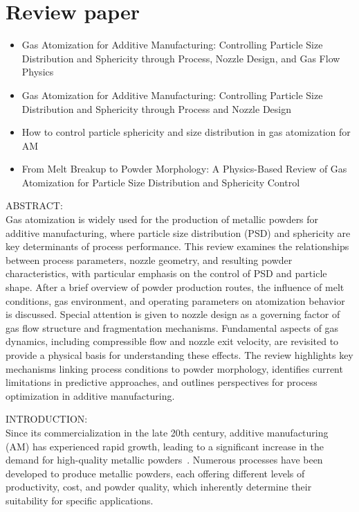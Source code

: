 \documentclass[../main]{subfiles}
\begin{document}
\section{Review paper}

\begin{itemize}
    \item Gas Atomization for Additive Manufacturing: Controlling Particle Size Distribution and Sphericity through Process, Nozzle Design, and Gas Flow Physics
    \item Gas Atomization for Additive Manufacturing: Controlling Particle Size Distribution and Sphericity through Process and Nozzle Design
    \item How to control particle sphericity and size distribution in gas atomization for AM
    \item From Melt Breakup to Powder Morphology: A Physics-Based Review of Gas Atomization for Particle Size Distribution and Sphericity Control
\end{itemize}

ABSTRACT:\\

Gas atomization is widely used for the production of metallic powders for additive manufacturing, where particle size distribution (PSD) and sphericity are key determinants of process performance. This review examines the relationships between process parameters, nozzle geometry, and resulting powder characteristics, with particular emphasis on the control of PSD and particle shape. After a brief overview of powder production routes, the influence of melt conditions, gas environment, and operating parameters on atomization behavior is discussed. Special attention is given to nozzle design as a governing factor of gas flow structure and fragmentation mechanisms. Fundamental aspects of gas dynamics, including compressible flow and nozzle exit velocity, are revisited to provide a physical basis for understanding these effects. The review highlights key mechanisms linking process conditions to powder morphology, identifies current limitations in predictive approaches, and outlines perspectives for process optimization in additive manufacturing.

INTRODUCTION:\\

Since its commercialization in the late 20th century, additive manufacturing (AM) has experienced rapid growth, leading to a significant increase in the demand for high-quality metallic powders~\cite{Feng2024PreparationAdditive}. Numerous processes have been developed to produce metallic powders, each offering different levels of productivity, cost, and powder quality, which inherently determine their suitability for specific applications.
\end{document}

